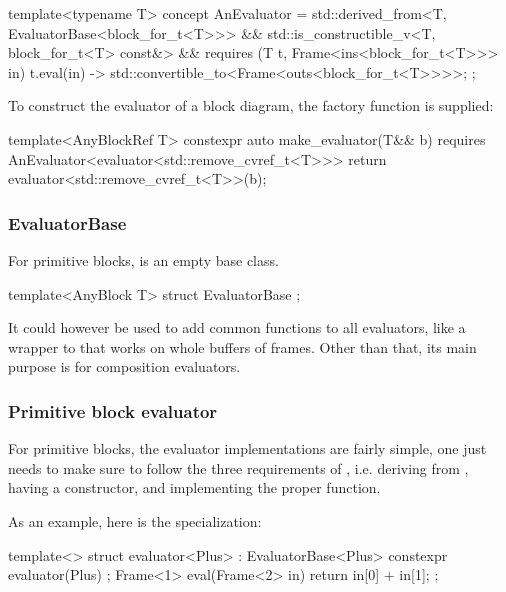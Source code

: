 \begin{cppcodenl}
  template<typename T>
  concept AnEvaluator = 
    std::derived_from<T, EvaluatorBase<block_for_t<T>>>
    && std::is_constructible_v<T, block_for_t<T> const&>
    && requires (T t, Frame<ins<block_for_t<T>>> in) {
      { t.eval(in) } -> std::convertible_to<Frame<outs<block_for_t<T>>>>;
    };
\end{cppcodenl}

To construct the evaluator of a block diagram, the factory function  is supplied:

\newpage
\begin{cppcodenl}
  template<AnyBlockRef T>
  constexpr auto make_evaluator(T&& b)
  requires AnEvaluator<evaluator<std::remove_cvref_t<T>>>
  {
    return evaluator<std::remove_cvref_t<T>>(b);
  }
\end{cppcodenl}

\subsubsection{EvaluatorBase}

For primitive blocks,  is an empty base class.

\begin{cppcodenl}
  template<AnyBlock T>
  struct EvaluatorBase {};
\end{cppcodenl}

It could however be used to add common functions to all evaluators, like a wrapper to 
that works on whole buffers of frames. Other than that, its main purpose is for composition evaluators.

\subsubsection{Primitive block evaluator}
For primitive blocks, the evaluator implementations are fairly simple, one just needs to make sure to follow
the three requirements of , i.e. deriving from
, having a  constructor, and implementing the proper 
function.

As an example, here is the  specialization:

\begin{cppcodenl}
  template<>
  struct evaluator<Plus> : EvaluatorBase<Plus> {
    constexpr evaluator(Plus) {};
    Frame<1> eval(Frame<2> in)
    {
      return {in[0] + in[1]};
    }
  };
\end{cppcodenl}


